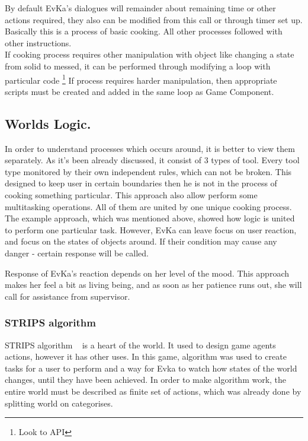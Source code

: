 \documentclass[18pt]{article}
\numberwithin{equation}{section} %
\numberwithin{figure}{section} %
\numberwithin{table}{section} %
\begin{document}
		By default EvKa's dialogues will remainder about remaining time or other actions required, they also can be modified from this call or through timer set up. Basically this is a process of basic cooking. All other processes followed with other instructions. \\
		
		If cooking process requires other manipulation with object like changing a state from solid to messed, it can be performed through modifying a loop with particular code \footnote{Look to API} If process requires harder manipulation, then appropriate scripts must be created and added in the same loop as Game Component.
		
	\subsection{Worlds Logic.}
		In order to understand processes which occurs around, it is better to view them separately. As it's been already discussed, it consist of 3 types of tool. Every tool type monitored by their own independent rules, which can not be broken. This designed to keep user in certain boundaries then he is not in the process of cooking something particular. This approach also allow perform some multitasking operations. All of them are united by one unique cooking process. The example approach, which was mentioned above, showed how logic is united to perform one particular task. However, EvKa can leave focus on user reaction, and focus on the states of objects around. If their condition may cause any danger - certain response will be called.
		
		Response of EvKa's reaction depends on her level of the mood. This approach makes her feel a bit as living being, and as soon as her patience runs out, she will call for assistance from supervisor.
		
	\subsubsection{STRIPS algorithm}
		STRIPS algorithm ~\cite{STRIPS} is a heart of the world. It used to design game agents actions, however it has other uses. In this game, algorithm was used to create tasks for a user to perform and a way for Evka to watch how states of the world changes, until they have been achieved. In order to make algorithm work, the entire world must be described as finite set of actions, which was already done by splitting world on categorises.
\end{document}
